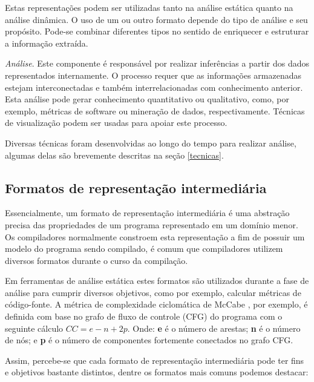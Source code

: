 \begin{description}
    Estas representações podem ser utilizadas tanto na análise estática quanto
    na análise dinâmica. O uso de um ou outro formato depende do tipo de
    análise e seu propósito. Pode-se combinar diferentes tipos no sentido de
    enriquecer e estruturar a informação extraída.

  \item \textit{Análise}.
    Este componente é responsável por realizar inferências a partir dos dados
    representados internamente. O processo requer que as informações
    armazenadas estejam interconectadas e também interrelacionadas com
    conhecimento anterior. Esta análise pode gerar conhecimento quantitativo
    ou qualitativo, como, por exemplo, métricas de software ou mineração de
    dados, respectivamente. Técnicas de visualização podem ser usadas para
    apoiar este processo.

    Diversas técnicas foram desenvolvidas ao longo do tempo para realizar
    análise, algumas delas são brevemente descritas na seção \ref{tecnicas}.

\end{description}

\subsection{Formatos de representação intermediária} \label{formatos}

Essencialmente, um formato de representação intermediária é uma abstração precisa
das propriedades de um programa representado em um domínio menor. Os
compiladores normalmente constroem esta representação a fim de possuir um
modelo do programa sendo compilado, é comum que compiladores utilizem diversos
formatos durante o curso da compilação.

Em ferramentas de análise estática estes formatos são utilizados durante a
fase de análise para cumprir diversos objetivos, como por exemplo, calcular
métricas de código-fonte. A métrica de complexidade ciclomática de McCabe
\cite{McCabe1976}, por exemplo, é definida com base no grafo de fluxo de controle (CFG) do
programa com o seguinte cálculo $CC = e - n + 2p$. Onde: {\bf e} é o número de
arestas; {\bf n} é o número de nós; e {\bf p} é o número de componentes
fortemente conectados no grafo CFG.

Assim, percebe-se que cada formato de representação intermediária \cite{Nielson2015}
\cite{Stanier2013} \cite{Cruz2009} \cite{Ramalho1996} pode ter fins e
objetivos bastante distintos, dentre os formatos mais comuns podemos destacar:

